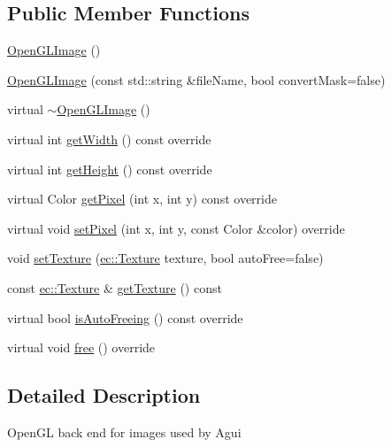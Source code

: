 \subsection*{Public Member Functions}
\begin{DoxyCompactItemize}
\item 
\mbox{\hyperlink{classagui_1_1_open_g_l_image_a0f58c2049c07f32e8bb01aad01997a80}{Open\+G\+L\+Image}} ()
\item 
\mbox{\hyperlink{classagui_1_1_open_g_l_image_a218cb6cfd4cbefbf50a87160fcba234f}{Open\+G\+L\+Image}} (const std\+::string \&file\+Name, bool convert\+Mask=false)
\item 
virtual \mbox{\hyperlink{classagui_1_1_open_g_l_image_aee49d8be1e992147614b9a78d6cf848c}{$\sim$\+Open\+G\+L\+Image}} ()
\item 
virtual int \mbox{\hyperlink{classagui_1_1_open_g_l_image_a065277a19487d6e5e961ba39706f8084}{get\+Width}} () const override
\item 
virtual int \mbox{\hyperlink{classagui_1_1_open_g_l_image_a6f08a29892fefbfda75f62cabcf03661}{get\+Height}} () const override
\item 
virtual Color \mbox{\hyperlink{classagui_1_1_open_g_l_image_acea75a4849d6e14c608bc93be52e20c4}{get\+Pixel}} (int x, int y) const override
\item 
virtual void \mbox{\hyperlink{classagui_1_1_open_g_l_image_a149afec919d0975af4fc48a078c183e2}{set\+Pixel}} (int x, int y, const Color \&color) override
\item 
void \mbox{\hyperlink{classagui_1_1_open_g_l_image_ad9134f3c8b65c3dbc8cff0e5452a8784}{set\+Texture}} (\mbox{\hyperlink{classec_1_1_texture}{ec\+::\+Texture}} texture, bool auto\+Free=false)
\item 
const \mbox{\hyperlink{classec_1_1_texture}{ec\+::\+Texture}} \& \mbox{\hyperlink{classagui_1_1_open_g_l_image_a7a2025b69dd0e462c8b46d97532d3036}{get\+Texture}} () const
\item 
virtual bool \mbox{\hyperlink{classagui_1_1_open_g_l_image_a55e602c6c198ce24b48c1e4ca60c0798}{is\+Auto\+Freeing}} () const override
\item 
virtual void \mbox{\hyperlink{classagui_1_1_open_g_l_image_ac6012525bdebca732f9ee527b4f385f2}{free}} () override
\end{DoxyCompactItemize}


\subsection{Detailed Description}
Open\+GL back end for images used by Agui 

